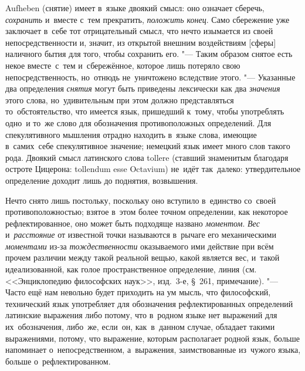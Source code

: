 Aufheben (снятие) имеет в~языке двоякий смысл: оно означает сберечь,
{\em сохранить} и~вместе с~тем прекратить, {\em положить конец}. Само
сбережение уже заключает в~себе тот отрицательный смысл, что нечто изымается из
своей непосредственности и, значит, из открытой внешним воздействиям [сферы]
наличного бытия для того, чтобы сохранить его. "--- Таким образом снятое есть
некое вместе~с~тем и~сбережённое, которое лишь потеряло свою
непосредственность, но~отнюдь не~уничтожено вследствие этого. "--- Указанные
два определения {\em снятия} могут быть приведены лексически как два {\em
значения} этого слова, но~удивительным при этом должно представляться
то~обстоятельство, что имеется язык, пришедший к~тому, чтобы употреблять одно~и
то~же слово для обозначения противоположных определений. Для спекулятивного
мышления отрадно находить в~языке слова, имеющие в~самих~себе спекулятивное
значение; немецкий язык имеет много слов такого рода. Двоякий смысл латинского
слова tollere (ставший знаменитым благодаря остроте Цицерона: tollendum esse
Octavium) не~идёт
так~далеко: утвердительное определение доходит лишь до поднятия, возвышения.

Нечто снято лишь постольку, поскольку оно вступило в~единство со~своей
противоположностью; взятое в~этом более точном определении, как некоторое
рефлектированное, оно может быть подходяще названо {\em моментом}. {\em Вес}
и~{\em расстояние} от известной точки называются в~рычаге его механическими
{\em моментами} из-за {\em тождественности} оказываемого ими действие при всём
прочем различии между такой реальной вещью, какой является вес, и~такой
идеализованной, как голое пространственное определение, линия (см.
<<Энциклопедию философских наук>>, изд.~3-е, \S~261, примечание). "--- Часто
ещё нам невольно будет приходить на ум мысль, что философский, технический язык
употребляет для обозначения рефлектированных определений латинские
выражения либо потому, что в~родном языке нет выражений
для их~обозначения, либо~же, если~он, как~в~данном случае, обладает такими
выражениями, потому, что выражение, которым располагает родной язык, больше
напоминает о~непосредственном, а~выражения, заимствованные из~чужого языка,
больше о~рефлектированном.

